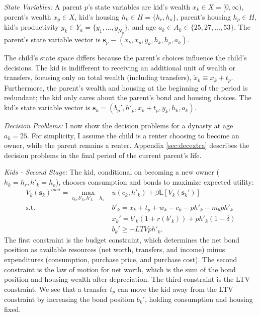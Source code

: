 \documentclass[12pt]{article}
\newcommand{\E}{\mathbb{E}}
\begin{document}
\textit{State Variables:} A parent $p$'s state variables are kid's wealth $x_k\in X=[0,\infty)$, parent's wealth $x_p\in X$, kid's housing $h_k\in H = \{h_r,h_o\}$, parent's housing $h_p\in H$, kid's productivity $y_k\in Y_a=\{y_1,\dots,y_{N_y}\}$, and age $a_k\in A_k\in\{25,27,\dots,53\}$. The parent's state variable vector is $\mathbf{s}_p\equiv\left(x_k,x_p,y_k,h_k,h_p,a_k\right)$. 

The child's state space differs because the parent's choices influence the child's decisions. The kid is indifferent to receiving an additional unit of wealth or transfers, focusing only on total wealth (including transfers), $\tilde x_k\equiv x_k+t_p$. Furthermore, the parent's wealth and housing at the beginning of the period is redundant; the kid only cares about the parent's bond and housing choices. The kid's state variable vector is $\mathbf{s}_k=\left(b_p',h'_p,x_k+t_p,y_k,h_k,a_k\right)$. 

\textit{Decision Problems:} 
I now show the decision problems for a dynasty at age $a_k=25$. For simplicity, I assume the child is a renter choosing to become an owner, while the parent remains a renter. Appendix \ref{sec:decextra} describes the decision problems in the final period of the current parent's life.

\textit{Kids - Second Stage:} The kid, conditional on becoming a new owner ($h_k=h_r,h'_k=h_o$), chooses consumption and bonds to maximize expected utility:
\begin{equation}\label{eq:Vk}
\begin{split}
 V_k(\mathbf{s}_k)^{own} = \max_{c_k,b'_k,h'_k=h_o} & u(c_k,h'_k) + \beta \E\left[V_{k}(\mathbf{s}_k') \right] \\ 
 \text{s.t.}\quad & 	b'_k = x_k + t_p + w_k - c_k - p h'_k - m_b p h'_k \\
 & x_k' = b'_k(1+r(b'_k)) + p h'_k(1-\delta) \\
 & b_k' \ge - LTV p h'_k. 
\end{split}
\end{equation}
The first constraint is the budget constraint, which determines the net bond position as available resources (net worth, transfers, and income) minus expenditures (consumption, purchase price, and purchase cost). The second constraint is the law of motion for net worth, which is the sum of the bond position and housing wealth after depreciation. The third constraint is the LTV constraint. We see that a transfer $t_p$ can move the kid away from the LTV constraint by increasing the bond position $b_k'$, holding consumption and housing fixed. 
\end{document}
